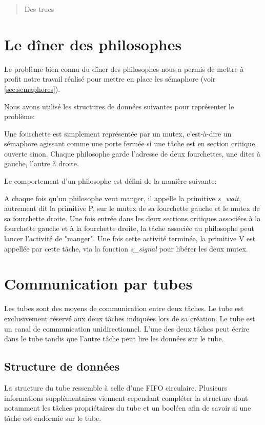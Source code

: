 \begin{abstract}
Des trucs
\end{abstract}

\section{Le dîner des philosophes}
Le problème bien connu du dîner des philosophes nous a permis de mettre à profit notre travail réalisé pour mettre en place les sémaphore (voir \ref{sec:semaphores}).

Nous avons utilisé les structures de données suivantes pour représenter le problème:

Une fourchette est simplement représentée par un mutex, c'est-à-dire un sémaphore agissant comme une porte fermée si une tâche est en section critique, ouverte sinon. Chaque philosophe garde l'adresse de deux fourchettes, une dites à gauche, l'autre à droite.

Le comportement d'un philosophe est défini de la manière suivante:

A chaque fois qu'un philosophe veut manger, il appelle la primitive \textit{s\_wait}, autrement dit la primitive P, sur le mutex de sa fourchette gauche et le mutex de sa fourchette droite. Une fois entrée dans les deux sections critiques associées à la fourchette gauche et à la fourchette droite, la tâche associée au philosophe peut lancer l'activité de "manger". Une fois cette activité terminée, la primitive V est appellée par cette tâche, via la fonction \textit{s\_signal} pour libérer les deux mutex.

\section{Communication par tubes}
Les tubes sont des moyens de communication entre deux tâches. Le tube est exclusivement réservé aux deux tâches indiquées lors de sa création.
Le tube est un canal de communication unidirectionnel. L'une des deux tâches peut écrire dans le tube tandis que l'autre tâche peut lire les données sur le tube.

\subsection{Structure de données}
La structure du tube ressemble à celle d'une FIFO circulaire. Plusieurs informations supplémentaires viennent cependant compléter la structure dont notamment les tâches propriétaires du tube et un booléen afin de savoir si une tâche est endormie sur le tube.


